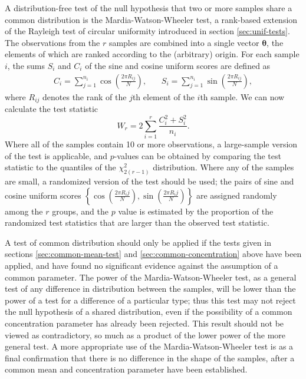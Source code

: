 \documentclass[../../ArchStats.tex]{subfiles}
\begin{document}
A distribution-free test of the null hypothesis that two or more samples share a common distribution is the Mardia-Watson-Wheeler test, a rank-based extension of the Rayleigh test of circular uniformity introduced in section \ref{sec:unif-tests}. The observations from the $r$ samples are combined into a single vector $\boldsymbol{\theta}$, the elements of which are ranked according to the (arbitrary) origin. For each sample $i$, the sums $S_i$ and $C_i$ of the sine and cosine uniform scores are defined as
\[
\begin{matrix*}
C_i = \sum_{j=1}^{n_i} \cos \left( \frac{2\pi R_{ij}}{N} \right),  & \,  &
S_i = \sum_{j=1}^{n_i} \sin \left( \frac{2\pi R_{ij}}{N} \right),
\end{matrix*} 
\]
where $R_{ij}$ denotes the rank of the $j$th element of the $i$th sample. We can now calculate the test statistic
\[W_r = 2 \sum_{i=1}^r \frac{C_i^2 + S_i^2}{n_i}. \]
Where all of the samples contain 10 or more observations, a large-sample version of the test is applicable, and $p$-values can be obtained by comparing the test statistic to the quantiles of the $\chi^2_{2(r-1)}$ distribution. Where any of the samples are small, a randomized version of the test should be used; the pairs of sine and cosine uniform scores $\left\lbrace \cos \left( \frac{2\pi R_ij}{N}\right), \sin \left( \frac{2\pi R_ij}{N}\right) \right\rbrace$ are assigned randomly among the $r$ groups, and the $p$ value is estimated by the proportion of the randomized test statistics that are larger than the observed test statistic.

A test of common distribution should only be applied if the tests given in sections \ref{sec:common-mean-test} and \ref{sec:common-concentration} above have been applied, and have found no significant evidence against the assumption of a common parameter. The power of the Mardia-Watson-Wheeler test, as a general test of any difference in distribution between the samples, will be lower than the power of a test for a difference of a particular type; thus this test may not reject the null hypothesis of a shared distribution, even if the possibility of a common concentration parameter has already been rejected. This result should not be viewed as contradictory, so much as a product of the lower power of the more general test. A more appropriate use of the Mardia-Watson-Wheeler test is as a final confirmation that there is no difference in the shape of the samples, after a common mean and concentration parameter have been established.
\end{document}
